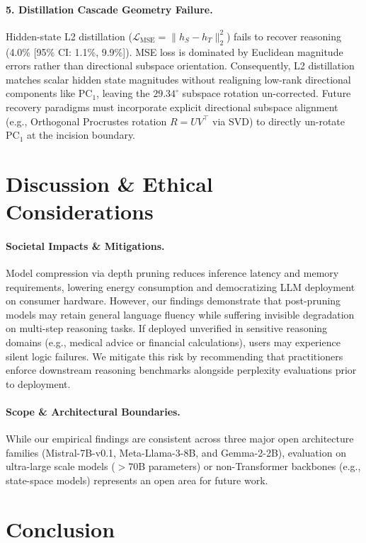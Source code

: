 \documentclass[11pt]{article}
\begin{document}
\paragraph{5. Distillation Cascade Geometry Failure.}
Hidden-state L2 distillation ($\mathcal{L}_{\text{MSE}} = \|h_S - h_T\|_2^2$) fails to recover reasoning (4.0\% [95\% CI: 1.1\%, 9.9\%]). MSE loss is dominated by Euclidean magnitude errors rather than directional subspace orientation. Consequently, L2 distillation matches scalar hidden state magnitudes without realigning low-rank directional components like $\mathrm{PC}_1$, leaving the $29.34^\circ$ subspace rotation un-corrected. Future recovery paradigms must incorporate explicit directional subspace alignment (e.g., Orthogonal Procrustes rotation $R = U V^\top$ via SVD) to directly un-rotate $\mathrm{PC}_1$ at the incision boundary.

\section{Discussion \& Ethical Considerations}

\paragraph{Societal Impacts \& Mitigations.}
Model compression via depth pruning reduces inference latency and memory requirements, lowering energy consumption and democratizing LLM deployment on consumer hardware. However, our findings demonstrate that post-pruning models may retain general language fluency while suffering invisible degradation on multi-step reasoning tasks. If deployed unverified in sensitive reasoning domains (e.g., medical advice or financial calculations), users may experience silent logic failures. We mitigate this risk by recommending that practitioners enforce downstream reasoning benchmarks alongside perplexity evaluations prior to deployment.

\paragraph{Scope \& Architectural Boundaries.}
While our empirical findings are consistent across three major open architecture families (Mistral-7B-v0.1, Meta-Llama-3-8B, and Gemma-2-2B), evaluation on ultra-large scale models ($>$70B parameters) or non-Transformer backbones (e.g., state-space models) represents an open area for future work.

\section{Conclusion}
\end{document}
